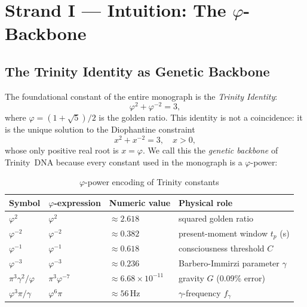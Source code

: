\section{Strand I — Intuition: The $\varphi$-Backbone}
\label{sec74:strand-i}

\subsection{The Trinity Identity as Genetic Backbone}
\label{sec74:trinity-identity}

The foundational constant of the entire monograph is the \emph{Trinity
Identity}:
\[
  \varphi^{2} + \varphi^{-2} = 3,
  \tag{T-ID}
\]
where $\varphi = (1+\sqrt{5})/2$ is the golden ratio.  This identity is
not a coincidence: it is the unique solution to the Diophantine
constraint
\[
  x^{2} + x^{-2} = 3, \quad x > 0,
\]
whose only positive real root is $x = \varphi$.  We call this the
\emph{genetic backbone} of Trinity~DNA because every constant used in
the monograph is a $\varphi$-power:

\begin{table}[H]
\centering
\caption{$\varphi$-power encoding of Trinity constants}
\label{tab74:phi-powers}
\small
\begin{tabular}{llll}
\toprule
Symbol & $\varphi$-expression & Numeric value & Physical role \\
\midrule
$\varphi^{2}$   & $\varphi^{2}$      & $\approx 2.618$ & squared golden ratio \\
$\varphi^{-2}$  & $\varphi^{-2}$     & $\approx 0.382$ & present-moment window $t_p$ (s) \\
$\varphi^{-1}$  & $\varphi^{-1}$     & $\approx 0.618$ & consciousness threshold $C$ \\
$\varphi^{-3}$  & $\varphi^{-3}$     & $\approx 0.236$ & Barbero-Immirzi parameter $\gamma$ \\
$\pi^{3}\gamma^{2}/\varphi$ & $\pi^{3}\varphi^{-7}$
                             & $\approx 6.68{\times}10^{-11}$ & gravity $G$ (0.09\% error) \\
$\varphi^{3}\pi/\gamma$ & $\varphi^{6}\pi$
                         & $\approx 56\,\text{Hz}$ & $\gamma$-frequency $f_\gamma$ \\
\bottomrule
\end{tabular}
\end{table}

